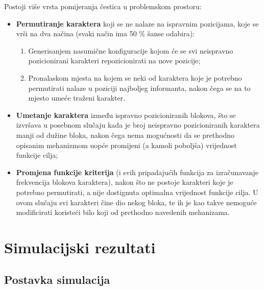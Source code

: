 \documentclass[12pt, a4paper]{article}
\begin{document}
Postoji više vrsta pomijeranja čestica u problemskom prostoru: \\

\begin{itemize}
\renewcommand\labelitemi{--}

\item \textbf{Permutiranje karaktera} koji se ne nalaze na ispravnim pozicijama, koje se vrši na dva načina (svaki način ima 50 \% šanse odabira):

\begin{enumerate}

\item Generisanjem nasumične konfiguracije kojom će se svi neispravno pozicionirani karakteri repozicionirati na nove pozicije;

\item Pronalaskom mjesta na kojem se neki od karaktera koje je potrebno permutirati nalaze u poziciji najboljeg informanta, nakon čega se na to mjesto umeće traženi karakter.

\end{enumerate}

\item \textbf{Umetanje karaktera} između ispravno pozicioniranih blokova, što se izvršava u posebnom slučaju kada je broj neispravno pozicioniranih karaktera manji od dužine bloka, nakon čega nema mogućnosti da se prethodno opisanim mehanizmom uopće promijeni (a kamoli poboljša) vrijednost funkcije cilja;

\item \textbf{Promjena funkcije kriterija} (i svih pripadajućih funkcija za izračunavanje frekvencija blokova karaktera), nakon što ne postoje karakteri koje je potrebno permutirati, a nije dostignuta optimalna vrijednost funkcije cilja. U ovom slučaju svi karakteri čine dio nekog bloka, te ih je kao takve nemoguće modificirati koristeći bilo koji od prethodno navedenih mehanizama.

\end{itemize}

\newpage

\section{Simulacijski rezultati}

\subsection{Postavka simulacija}
\end{document}
